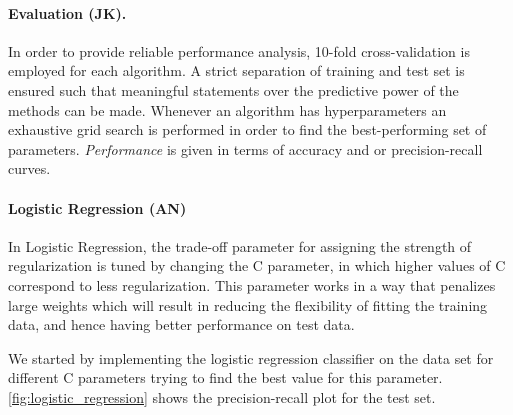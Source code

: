 \documentclass[12pt, a4paper]{scrartcl}
\begin{document}
\paragraph{Evaluation (JK).} In order to provide reliable performance analysis, 10-fold cross-validation is employed for each algorithm. A strict separation of training and test set is ensured such that meaningful statements over the predictive power of the methods can be made.
Whenever an algorithm has hyperparameters an exhaustive grid search is performed in order to find the best-performing set of parameters. \emph{Performance} is given in terms of accuracy and or precision-recall curves. 

\paragraph{Logistic Regression (AN)} In Logistic Regression, the trade-off parameter for assigning the strength of regularization is tuned by changing the C parameter, in which higher values of C correspond to less regularization. This parameter works in a way that penalizes large weights which will result in reducing the flexibility of fitting the training data, and hence having better performance on test data.

We started by implementing the logistic regression classifier on the data set for different C parameters trying to find the best value for this parameter. \cref{fig:logistic_regression} shows the precision-recall plot for the test set. 
\end{document}
